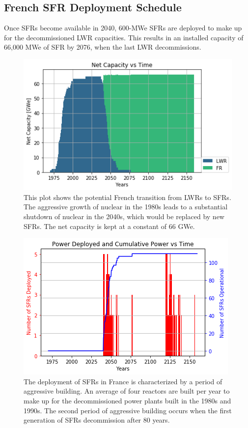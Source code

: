 \subsection{French \gls{SFR} Deployment Schedule}

Once \glspl{SFR} become available in 2040,
600-MWe \glspl{SFR} are deployed to make up for the 
decommissioned \gls{LWR} capacities. 
This results in an installed capacity of 66,000 MWe
of \gls{SFR} by 2076, when the last \gls{LWR} decommissions.

\begin{figure}[htbp!]
        \begin{center}
                \includegraphics[scale=0.7]{./images/french-transition/power_plot.png}
        \end{center}
        \caption{This plot shows the potential French transition from \glspl{LWR} to \glspl{SFR}.
				 The aggressive growth of nuclear in the 1980s leads to a substantial shutdown
				 of nuclear in the 2040s, which would be replaced by new \glspl{SFR}. The net
				 capacity is kept at a constant of 66 GWe.}
        \label{fig:sfr_num}
\end{figure}
\begin{figure}[htbp!]
	\begin{center}
		\includegraphics[scale=0.7]{./images/french-transition/sfr_deploy.png}
	\end{center}
	\caption{The deployment of \glspl{SFR} in France is characterized by a period of
		     aggressive building. An average of four reactors are built per year to
		     make up for the decommissioned power plants built in the 1980s and 1990s.
		     The second period of aggressive building occurs when the first generation
		     of \glspl{SFR} decommission after 80 years.}
	\label{fig:dep}
\end{figure}
\FloatBarrier


